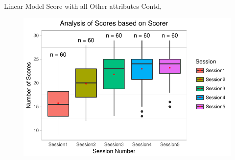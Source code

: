 \documentclass{beamer}
\begin{document}
\begin{frame}{Linear Model}{ Score with all Other attributes Contd,}
\begin{figure}
\begin{minipage}[c]{0.4\linewidth}
	\end{minipage}
	\hfill
	\begin{minipage}[c]{0.4\linewidth}
	\includegraphics[width=\linewidth]{SessionVsScore.pdf}
	\end{minipage}
\end{figure}
 \end{frame}
\end{document}

